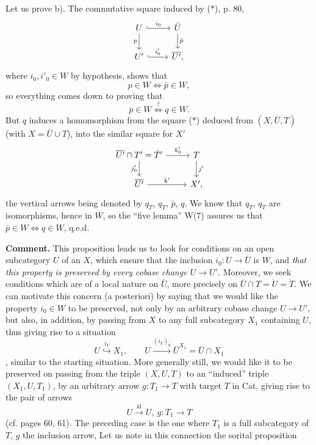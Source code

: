 \documentclass[11pt]{article}
\newcommand{\printedpage}[1]{\marginpar{\footnotesize p.~#1}}
\newcommand{\msp}[1]{\marginpar{\footnotesize [#1]}}
\begin{document}
Let us prove b). The commutative square induced by ($*$), p. 80,
\printedpage{60}
\[
\begin{tikzcd}
U \arrow[r, hook, "i_0"] \arrow[d, "p"'] & \bar U \arrow[d, "\bar p"] \\
U' \arrow[r, hook, "i'_0"] & \overline{U'},
\end{tikzcd}
\]
where $i_0,i'_0\in W$ by hypothesis, shows that
\[
p\in W\iff\bar p\in W,
\]
so everything comes down to proving that
\[
\bar p\in W\overset{?}{\iff}q\in W.
\]
But $q$ induces a homomorphism from the square ($*$) deduced from $(X,\bar U,T)$ (with $X=\bar U\cup T$), into the similar square for $X'$
\[
\begin{tikzcd}
\overline{U'}\cap T'=\dot T' \arrow[r, "k'_0"] \arrow[d, "j'_0"'] & T \arrow[d, "j'"] \\ %
\overline{U'} \arrow[r, "k'"] & X',
\end{tikzcd}
\]
the vertical arrows being denoted by $q_{\dot T}$, $q_T$, $\bar p$, $q$.
\msp{page 83}
We know that $q_{\dot T}$, $q_T$ are isomorphisms, hence in $W$, so the ``five lemma'' W(7) assures us that $\bar p\in W\iff q\in W$, q.e.d.

\textbf{Comment.} This proposition leads us to look for conditions on an open subcategory $U$ of an $X$, which ensure that the inclusion $i_0:U\longrightarrow\bar U$ is $W$, and \textit{that this property is preserved by every cobase change $U\longrightarrow U'$.} Moreover, we seek conditions which are of a local nature on $\bar U$, more precisely on $\bar U\cap T=\dot U=\dot T$. We can motivate this concern (a posteriori) by saying that we would like the property $i_0\in W$ to be preserved, not only by an arbitrary cobase change $U\longrightarrow U'$, but also, in addition, by passing from $X$ to any full subcategory $X_1$ containing $U$, thus giving rise to a situation
\[
U\overset{i_Y}{\hookrightarrow}X_1,\qquad U\xrightarrow{(i_Y)_0}\bar U^{X_1}=\bar U\cap X_1
\]
, similar to the starting situation. More generally still, we would like it to be preserved on passing from the triple $(X,U,T)$ to an ``induced'' triple $(X_1,U,T_1)$, by an arbitrary arrow $g:T_1\longrightarrow T$ with target $T$ in Cat, giving rise to the pair of arrows
\[
U\xrightarrow{\mathrm{id}}U,\ g:T_1\longrightarrow T
\]
(cf. pages 60, 61). The preceding case is the one where
\printedpage{61}
\msp{page 84}
$T_1$ is a full subcategory of $T$, $g$ the inclusion arrow, Let us note in this connection the sorital proposition %
\end{document}
